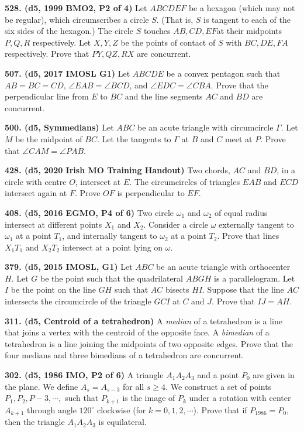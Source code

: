 \documentclass{article}
\begin{document}
\textbf{528. (\color{red}d5\color{black}, 1999 BMO2, P2 of 4)} Let $ABCDEF$ be a hexagon (which may not be regular), which circumscribes a circle $S$. (That is, $S$ is tangent to each of the six sides of the hexagon.) The circle $S$ touches $AB, CD, EF$at their midpoints $P, Q, R$ respectively. Let $X, Y, Z$ be the points of contact of $S$ with $BC, DE, FA$ respectively. Prove that $PY, QZ, RX$ are concurrent.

\textbf{507. (\color{red}d5\color{black}, 2017 IMOSL G1)} Let $ABCDE$ be a convex pentagon such that $AB = BC = CD$, $\angle EAB = \angle BCD$, and $\angle EDC = \angle CBA$. Prove that the perpendicular line from $E$ to $BC$ and the line segments $AC$ and $BD$ are concurrent.

\textbf{500. (\color{red}d5\color{black}, Symmedians)} Let $ABC$ be an acute triangle with circumcircle $\Gamma$. Let $M$ be the midpoint of $BC$. Let the tangents to $\Gamma$ at $B$ and $C$ meet at $P$. Prove that $\angle CAM = \angle PAB$.

\textbf{428. (\color{red}d5\color{black}, 2020 Irish MO Training Handout)} Two chords, \(A C\) and \(B D\), in a circle with centre \(O\), intersect at \(E .\) The circumcircles of triangles \(E A B\) and \(E C D\) intersect again at \(F .\) Prove \(O F\) is perpendicular to \(E F\).

\textbf{408. (\color{red}d5\color{black}, 2016 EGMO, P4 of 6)} Two circle $\omega_1$ and $\omega_2$ of equal radius intersect at different points $X_1$ and $X_2$. Consider a circle $\omega$ externally tangent to $\omega_1$ at a point $T_1$, and internally tangent to $\omega_2$ at a point $T_2$. Prove that lines $X_1T_1$ and $X_2T_2$ intersect at a point lying on $\omega$.

\textbf{379. (\color{red}d5\color{black}, 2015 IMOSL, G1)} Let $ABC$ be an acute triangle with orthocenter $H$. Let $G$ be the point such that the quadrilateral $ABGH$ is a parallelogram. Let $I$ be the point on the line $GH$ such that $AC$ bisects $HI$. Suppose that the line $AC$ intersects the circumcircle of the triangle $GCI$ at $C$ and $J$. Prove that $IJ = AH$.

\textbf{311. (\color{red}d5\color{black}, Centroid of a tetrahedron)} A \emph{median} of a tetrahedron is a line that joins a vertex with the centroid of the opposite face. A \emph{bimedian} of a tetrahedron is a line joining the midpoints of two opposite edges. Prove that the four medians and three bimedians of a tetrahedron are concurrent.

\textbf{302. (\color{red}d5\color{black}, 1986 IMO, P2 of 6)} A triangle $A_1 A_2 A_3$ and a point $P_0$ are given in the plane. We define $A_s = A_{s-3}$ for all $s \geq 4$. We construct a set of points $P_1, P_2, P-3, \cdots ,$ such that $P_{k+1}$ is the image of $P_k$ under a rotation with center $A_{k+1}$ through angle $120^{\circ}$ clockwise (for $k = 0,1,2,\cdots$). Prove that if $P_{1986} = P_0$, then the triangle $A_1 A_2 A_3$ is equilateral.
\end{document}
